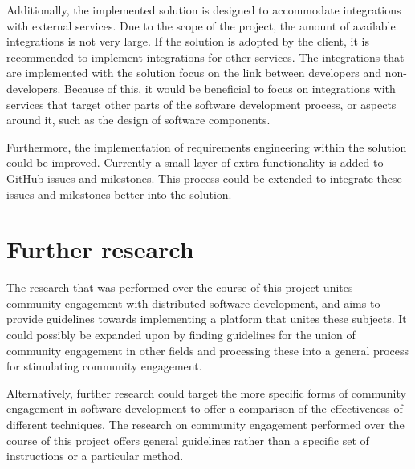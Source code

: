 Additionally, the implemented solution is designed to accommodate integrations with external services. Due to the scope of the project, 
the amount of available integrations is not very large. If the solution is adopted by the client, it is recommended to implement integrations for other services. The integrations that are implemented with the solution focus on the link between developers and non-developers. Because of this, it would be beneficial to focus on integrations with services that target other parts of the software development process, or aspects around it, such as the design of software components.

Furthermore, the implementation of requirements engineering within the solution could be improved. Currently a small layer of extra functionality is added to GitHub issues and milestones. This process could be extended to integrate these issues and milestones better into the solution.

\section{Further research}
The research that was performed over the course of this project unites community engagement with distributed software development, and aims to provide guidelines towards implementing a platform that unites these subjects. It could possibly be expanded upon by finding guidelines for the union of community engagement in other fields and processing these into a general process for stimulating community engagement.

Alternatively, further research could target the more specific forms of community engagement in software development to offer a comparison of the effectiveness of different techniques. The research on community engagement performed over the course of this project offers general guidelines rather than a specific set of instructions or a particular method.